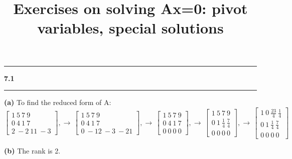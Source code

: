 \documentclass[11pt]{article}
\newcommand\question[2]{\vspace{.25in}\hrule\textbf{#1 #2}\vspace{.5em}\hrule\vspace{.10in}}
\renewcommand\part[1]{\vspace{.10in}\textbf{(#1)}}
\begin{document}
\raggedright
\newcommand\NAME{Haiying Cui}  %
\newcommand\ANDREWID{Christy}     %
\newcommand\HWNUM{7}              %

\title{Exercises on solving Ax=0: pivot variables, special solutions}
\maketitle

\question{7.1}{}
\part{a} To find the reduced form of A:
\(\begin{bmatrix} 1 \ 5 \ 7 \ 9 \\ 0 \ 4 \ 1 \ 7 \\ 2 \ -2 \ 11 \ -3 \end{bmatrix},\to\,\begin{bmatrix} 1 \ 5 \ 7 \ 9 \\ 0 \ 4 \ 1 \ 7 \\ 0 \ -12 \ -3 \ -21 \end{bmatrix},\to\,\begin{bmatrix} 1 \ 5 \ 7 \ 9 \\ 0 \ 4 \ 1 \ 7 \\ 0 \ 0 \ 0 \ 0 \end{bmatrix},\to\,\begin{bmatrix} 1 \ 5 \ 7 \ 9 \\ 0 \ 1 \ \frac{1}{4} \ \frac{7}{4} \\ 0 \ 0 \ 0 \ 0 \end{bmatrix},\to\,\begin{bmatrix} 1 \ 0 \ \frac{23}{4} \ \frac{1}{4} \\ 0 \ 1 \ \frac{1}{4} \ \frac{7}{4} \\ 0 \ 0 \ 0 \ 0 \end{bmatrix}\)

\part{b} The rank is 2.
\end{document}
